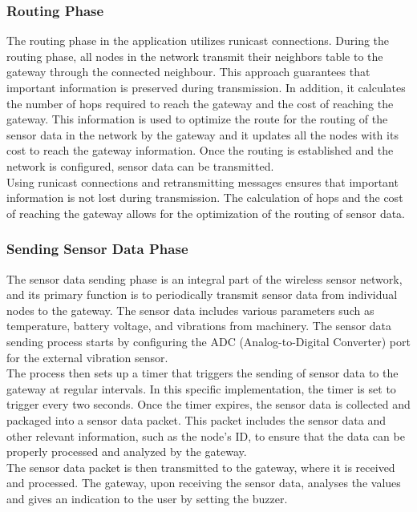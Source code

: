\documentclass[conference]{IEEEtran}
\begin{document}
\subsubsection{Routing Phase}\label{AA}
The routing phase in the application utilizes runicast connections. During the routing phase, all nodes in the network transmit their neighbors table to the gateway through the connected neighbour. This approach guarantees that important information is preserved during transmission.
In addition, it calculates the number of hops required to reach the gateway and the cost of reaching the gateway. This information is used to optimize the route for the routing of the sensor data in the network by the gateway and it updates all the nodes with its cost to reach the gateway information. Once the routing is established and the network is configured, sensor data can be transmitted.\\
Using runicast connections and retransmitting messages ensures that important information is not lost during transmission. The calculation of hops and the cost of reaching the gateway allows for the optimization of the routing of sensor data. 

\subsubsection{Sending Sensor Data Phase}\label{AA}
The sensor data sending phase is an integral part of the wireless sensor network, and its primary function is to periodically transmit sensor data from individual nodes to the gateway. The sensor data includes various parameters such as temperature, battery voltage, and vibrations from machinery. The sensor data sending process starts by configuring the ADC (Analog-to-Digital Converter) port for the external vibration sensor.\\
The process then sets up a timer that triggers the sending of sensor data to the gateway at regular intervals. In this specific implementation, the timer is set to trigger every two seconds.
Once the timer expires, the sensor data is collected and packaged into a sensor data packet. This packet includes the sensor data and other relevant information, such as the node's ID, to ensure that the data can be properly processed and analyzed by the gateway.\\
The sensor data packet is then transmitted to the gateway, where it is received and processed. The gateway, upon receiving the sensor data, analyses the values and gives an indication to the user by setting the buzzer.
\end{document}
